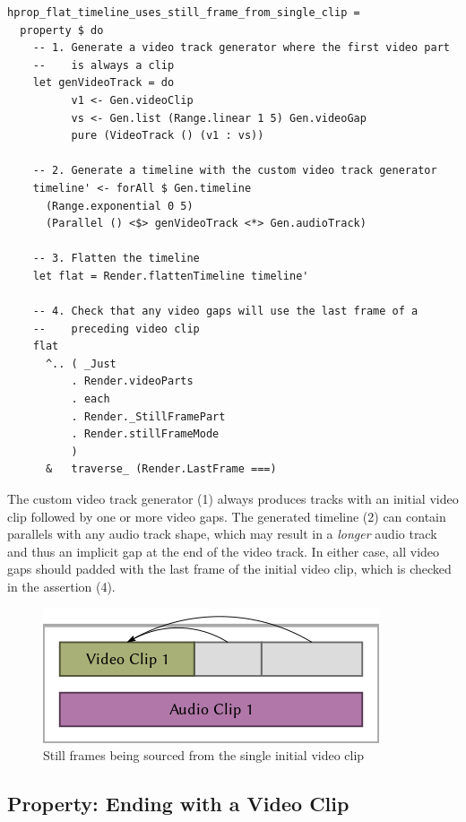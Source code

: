 \begin{verbatim}
hprop_flat_timeline_uses_still_frame_from_single_clip =
  property $ do
    -- 1. Generate a video track generator where the first video part
    --    is always a clip
    let genVideoTrack = do
          v1 <- Gen.videoClip
          vs <- Gen.list (Range.linear 1 5) Gen.videoGap
          pure (VideoTrack () (v1 : vs))
  
    -- 2. Generate a timeline with the custom video track generator
    timeline' <- forAll $ Gen.timeline
      (Range.exponential 0 5)
      (Parallel () <$> genVideoTrack <*> Gen.audioTrack)
  
    -- 3. Flatten the timeline
    let flat = Render.flattenTimeline timeline'
  
    -- 4. Check that any video gaps will use the last frame of a 
    --    preceding video clip
    flat
      ^.. ( _Just
          . Render.videoParts
          . each
          . Render._StillFramePart
          . Render.stillFrameMode
          )
      &   traverse_ (Render.LastFrame ===)
\end{verbatim}
The custom video track generator (1) always produces tracks with an initial video clip followed by one or more video gaps. The generated timeline (2) can contain parallels with any audio track shape, which may result in a \textit{longer} audio track and thus an implicit gap at the end of the video track. In either case, all video gaps should padded with the last frame of the initial video clip, which is checked in the assertion (4).
\begin{figure}[htbp]
 \centering
 \includegraphics[width=.95\linewidth]{./pics/case1_8.png}
 \caption{Still frames being sourced from the single initial video clip}
 \label{fig:case1_8}
\end{figure}


\subsection{Property: Ending with a Video Clip}


